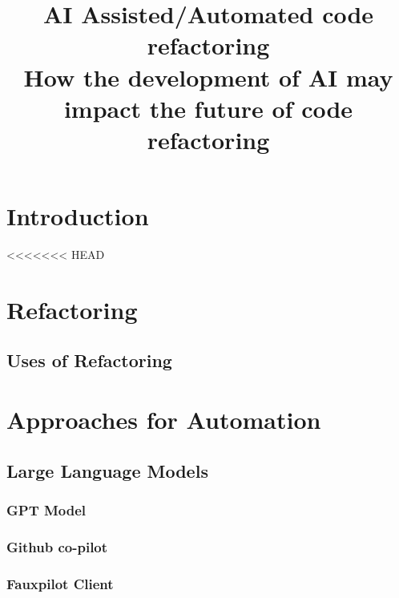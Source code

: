 \documentclass[conference]{IEEEtran}
\begin{document}
\title{AI Assisted/Automated code refactoring\\
{\footnotesize How the development of AI may impact the future of code refactoring}
}

\author{
    \and
}

\maketitle



\section{Introduction}\label{introduction}


<<<<<<< HEAD
\section{Refactoring}
\subsection{Uses of Refactoring}


\section{Approaches for Automation}

\subsection{Large Language Models}
\subsubsection{GPT Model}
\subsubsection{Github co-pilot}
\subsubsection{Fauxpilot Client}
\end{document}
